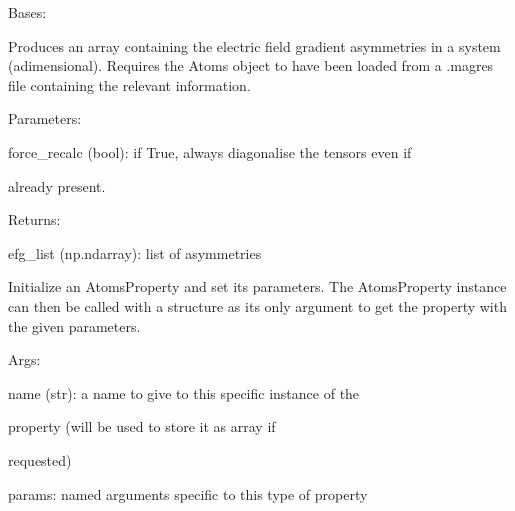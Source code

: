 \documentclass[letterpaper,10pt,english]{sphinxmanual}
\begin{document}
\begin{fulllineitems}
\label{doctree/soprano.properties.nmr.efg:soprano.properties.nmr.efg.EFGAsymmetry}
Bases: {\hyperref[doctree/soprano.properties.atomsproperty:soprano.properties.atomsproperty.AtomsProperty]{}}

Produces an array containing the electric field gradient asymmetries
in a system (adimensional).
Requires the Atoms object to have been loaded from a .magres file
containing the relevant information.

\begin{DUlineblock}{0em}
\item[] Parameters:
\item[]
\begin{DUlineblock}{\DUlineblockindent}
\item[] force\_recalc (bool): if True, always diagonalise the tensors even if
\item[]
\begin{DUlineblock}{\DUlineblockindent}
\item[] already present.
\end{DUlineblock}
\end{DUlineblock}
\end{DUlineblock}

\begin{DUlineblock}{0em}
\item[] Returns:
\item[]
\begin{DUlineblock}{\DUlineblockindent}
\item[] efg\_list (np.ndarray): list of asymmetries
\end{DUlineblock}
\end{DUlineblock}

Initialize an AtomsProperty and set its parameters.
The AtomsProperty instance can then be called with a structure as its
only argument to get the property with the given parameters.

\begin{DUlineblock}{0em}
\item[] Args:
\item[]
\begin{DUlineblock}{\DUlineblockindent}
\item[] name (str): a name to give to this specific instance of the
\item[]
\begin{DUlineblock}{\DUlineblockindent}
\item[] property (will be used to store it as array if
\item[] requested)
\end{DUlineblock}
\item[] params: named arguments specific to this type of property
\end{DUlineblock}
\end{DUlineblock}


\end{fulllineitems}
\end{document}
